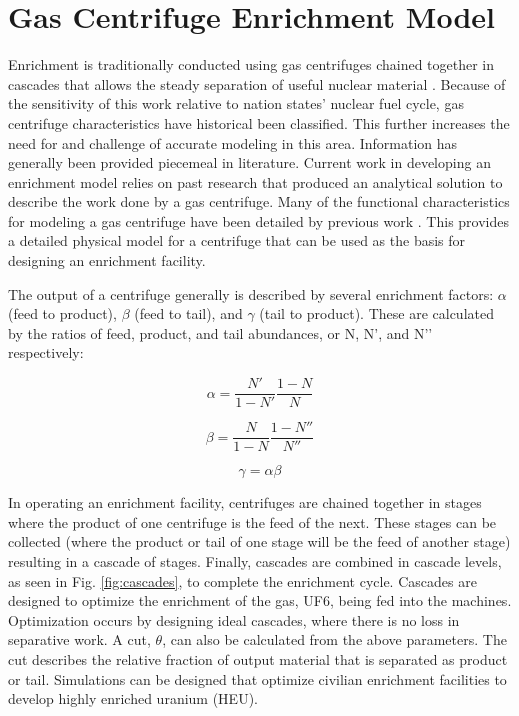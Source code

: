 \documentclass{article}
\begin{document}
\section{Gas Centrifuge Enrichment Model}

Enrichment is traditionally conducted using gas centrifuges chained together in cascades that allows the steady separation of useful nuclear material \cite{avery}. Because of the sensitivity of this work relative to nation states’ nuclear fuel cycle, gas centrifuge characteristics have historical been classified. This further increases the need for and challenge of accurate modeling in this area. Information has generally been provided piecemeal in literature. Current work in developing an enrichment model relies on past research that produced an analytical solution \cite{raetz.phd} to describe the work done by a gas centrifuge. Many of the functional characteristics for modeling a gas centrifuge have been detailed by previous work \cite{glaser.2008}. This provides a detailed physical model for a centrifuge that can be used as the basis for designing an enrichment facility.

The output of a centrifuge generally is described by several enrichment factors: $\alpha$ (feed to product), $\beta$ (feed to tail), and $\gamma$ (tail to product). These are calculated by the ratios of feed, product, and tail abundances, or N, N’, and N’’ respectively:

\begin{equation}
    \alpha = \frac{N'}{1-N'}\frac{1-N}{N}
\end{equation}

\begin{equation}
    \beta = \frac{N}{1-N}\frac{1-N''}{N''}
\end{equation}

\begin{equation}
    \gamma = \alpha\beta
\end{equation}

In operating an enrichment facility, centrifuges are chained together in stages where the product of one centrifuge is the feed of the next. These stages can be collected (where the product or tail of one stage will be the feed of another stage) resulting in a cascade of stages. Finally, cascades are combined in cascade levels, as seen in Fig. \ref{fig:cascades}, to complete the enrichment cycle. Cascades are designed to optimize the enrichment of the gas, UF6, being fed into the machines. Optimization occurs by designing ideal cascades, where there is no loss in separative work. A cut, $\theta$, can also be calculated from the above parameters. The cut describes the relative fraction of output material that is separated as product or tail. Simulations can be designed that optimize civilian enrichment facilities to develop highly enriched uranium (HEU).
\end{document}
